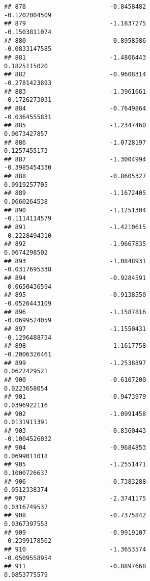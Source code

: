 \documentclass[
]{article}
\begin{document}
\begin{verbatim}
## 878                       -0.8458482                         -0.1202004509
## 879                       -1.1837275                         -0.1503811074
## 880                       -0.8958586                         -0.0833147585
## 881                       -1.4806443                          0.1825115020
## 882                       -0.9608314                         -0.2781423893
## 883                       -1.3961661                         -0.1726273031
## 884                       -0.7649864                         -0.0364555831
## 885                       -1.2347460                          0.0073427857
## 886                       -1.0728197                          0.1257455173
## 887                       -1.3004994                         -0.3985454330
## 888                       -0.8605327                          0.0919257705
## 889                       -1.1672405                          0.0660264538
## 890                       -1.1251304                         -0.1114114579
## 891                       -1.4210615                         -0.2228494310
## 892                       -1.9667835                          0.0674298502
## 893                       -1.0848931                         -0.0317695338
## 894                       -0.9284591                         -0.0650436594
## 895                       -0.9138550                         -0.0526443109
## 896                       -1.1587816                         -0.0699524059
## 897                       -1.1550431                         -0.1296488754
## 898                       -1.1617758                         -0.2006326461
## 899                       -1.2538897                          0.0622429521
## 900                       -0.6107200                          0.0223658054
## 901                       -0.9473979                          0.0396922116
## 902                       -1.0991458                          0.0131911391
## 903                       -0.8360443                         -0.1004526032
## 904                       -0.9684853                          0.0699011018
## 905                       -1.2551471                          0.1000726637
## 906                       -0.7383288                          0.0512338374
## 907                       -2.3741175                          0.0316749537
## 908                       -0.7375842                          0.0367397553
## 909                       -0.9919107                         -0.2399178502
## 910                       -1.3653574                         -0.0509558954
## 911                       -0.8897668                          0.0853775579

\end{verbatim}
\end{document}

